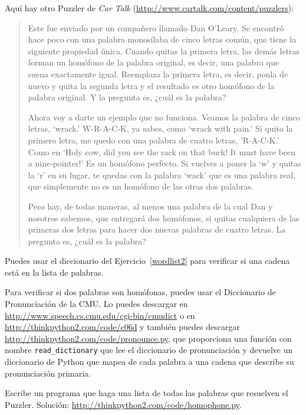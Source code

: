 \documentclass[10pt]{book}
\begin{document}
\begin{exercise}

Aquí hay otro Puzzler de {\em Car Talk}
(\url{http://www.cartalk.com/content/puzzlers}):

\begin{quote}
Este fue enviado por un compañero llamado Dan O'Leary. Se encontró hace poco con una palabra
monosílaba de cinco letras común, que tiene la siguiente propiedad
única. Cuando quitas la primera letra, las demás letras forman
un homófono de la palabra original, es decir, una palabra que suena exactamente
igual. Reemplaza la primera letra, es decir, ponla de nuevo y quita
la segunda letra y el resultado es otro homófono de la
palabra original. Y la pregunta es, ¿cuál es la palabra?

Ahora voy a darte un ejemplo que no funciona. Veamos la palabra
de cinco letras, `wrack.' W-R-A-C-K, ya sabes, como `wrack with
pain.' Si quito la primero letra, me quedo con una palabra de cuatro
letras, 'R-A-C-K.' Como en `Holy cow, did you see the rack on that buck!
It must have been a nine-pointer!' Es un homófono perfecto. Si
vuelves a poner la `w' y quitas la `r' en su lugar, te quedas con la
palabra `wack' que es una palabra real, que simplemente no es un homófono de las
otras dos palabras.

Pero hay, de todas maneras, al menos una palabra de la cual Dan y nosotros sabemos,
que entregará dos homófonos, si quitas cualquiera de las primeras dos
letras para hacer dos nuevas palabras de cuatro letras. La pregunta es, ¿cuál
es la palabra?
\end{quote}

Puedes usar el diccionario del Ejercicio~\ref{wordlist2} para verificar
si una cadena está en la lista de palabras.

Para verificar si dos palabras son homófonas, puedes usar el
Diccionario de Pronunciación de la CMU.  Lo puedes descargar en
\url{http://www.speech.cs.cmu.edu/cgi-bin/cmudict} o en
\url{http://thinkpython2.com/code/c06d} y también puedes descargar
\url{http://thinkpython2.com/code/pronounce.py}, que proporciona una función
con nombre \verb"read_dictionary" que lee el diccionario de pronunciación y
devuelve un diccionario de Python que mapea de cada palabra a una cadena que 
describe su pronunciación primaria.

Escribe un programa que haga una lista de todas las palabras que resuelven el Puzzler.
Solución: \url{http://thinkpython2.com/code/homophone.py}.

\end{exercise}
\end{document}
